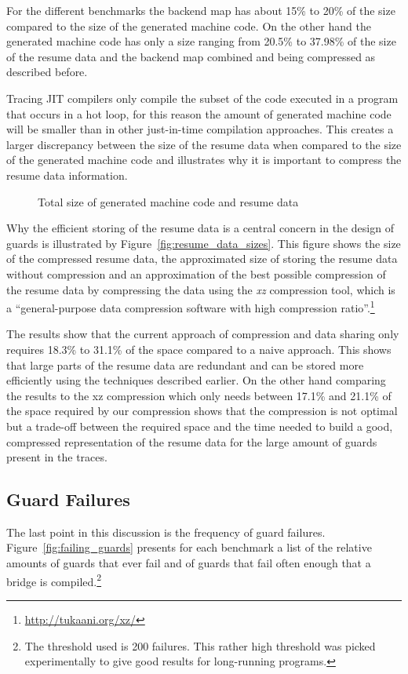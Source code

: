 \documentclass[10pt,preprint]{sigplanconf}
\begin{document}
For the different benchmarks the backend map has
about 15\% to 20\% of the size compared to the size of the
generated machine code. On the other hand the generated machine code has only a
size ranging from 20.5\% to 37.98\% of the size of the resume data and the backend map
combined and being compressed as described before.

Tracing JIT compilers only compile the subset of the code executed in a program
that occurs in a hot loop, for this reason the amount of generated machine
code will be smaller than in other just-in-time compilation approaches.  This
creates a larger discrepancy between the size of the resume data when
compared to the size of the generated machine code and illustrates why it is important to compress the resume data information.

\begin{figure}
    
    \caption{Total size of generated machine code and resume data}
    \label{fig:backend_data}
\end{figure}

Why the efficient storing of the resume data is a central concern in the design
of guards is illustrated by Figure~\ref{fig:resume_data_sizes}. This figure shows
the size of the compressed resume data, the approximated size of
storing the resume data without compression and
an approximation of the best possible compression of the resume data by
compressing the data using the
\emph{xz} compression tool, which is a ``general-purpose data compression
software with high compression ratio''.\footnote{\url{http://tukaani.org/xz/}}

The results show that the current approach of compression and data sharing only
requires 18.3\% to 31.1\% of the space compared to a naive approach. This
shows that large parts of the resume data are redundant and can be stored more
efficiently using the techniques described earlier. On the other hand
comparing the results to the xz compression which only needs between 17.1\%
and 21.1\% of the space required by our compression shows that the compression
is not optimal but a trade-off between the required space and the time needed
to build a good, compressed representation of the resume data for the
large amount of guards present in the traces.

\subsection{Guard Failures}
\label{sub:guard_failure}
The last point in this discussion is the frequency of guard failures.
Figure~\ref{fig:failing_guards} presents for each benchmark a list of the
relative amounts of guards that ever fail and of guards that fail often enough that a bridge is compiled.\footnote{
    The threshold used is 200 failures. This rather high threshold was picked experimentally to give
    good results for long-running programs.
}
\end{document}
